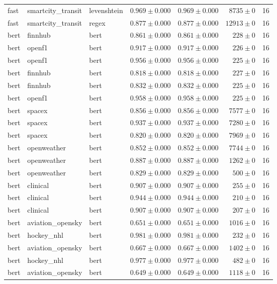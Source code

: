 \begin{table}[htbp]
\begin{tabular}{l l l r r r r}
fast & smartcity\_transit & levenshtein & $0.969\pm0.000$ & $0.969\pm0.000$ & $8735\pm0$ & 16 \\
fast & smartcity\_transit & regex & $0.877\pm0.000$ & $0.877\pm0.000$ & $12913\pm0$ & 16 \\
bert & finnhub & bert & $0.861\pm0.000$ & $0.861\pm0.000$ & $228\pm0$ & 16 \\
bert & openf1 & bert & $0.917\pm0.000$ & $0.917\pm0.000$ & $226\pm0$ & 16 \\
bert & openf1 & bert & $0.956\pm0.000$ & $0.956\pm0.000$ & $225\pm0$ & 16 \\
bert & finnhub & bert & $0.818\pm0.000$ & $0.818\pm0.000$ & $227\pm0$ & 16 \\
bert & finnhub & bert & $0.832\pm0.000$ & $0.832\pm0.000$ & $225\pm0$ & 16 \\
bert & openf1 & bert & $0.958\pm0.000$ & $0.958\pm0.000$ & $225\pm0$ & 16 \\
bert & spacex & bert & $0.856\pm0.000$ & $0.856\pm0.000$ & $7577\pm0$ & 16 \\
bert & spacex & bert & $0.937\pm0.000$ & $0.937\pm0.000$ & $7280\pm0$ & 16 \\
bert & spacex & bert & $0.820\pm0.000$ & $0.820\pm0.000$ & $7969\pm0$ & 16 \\
bert & openweather & bert & $0.852\pm0.000$ & $0.852\pm0.000$ & $7744\pm0$ & 16 \\
bert & openweather & bert & $0.887\pm0.000$ & $0.887\pm0.000$ & $1262\pm0$ & 16 \\
bert & openweather & bert & $0.829\pm0.000$ & $0.829\pm0.000$ & $500\pm0$ & 16 \\
bert & clinical & bert & $0.907\pm0.000$ & $0.907\pm0.000$ & $255\pm0$ & 16 \\
bert & clinical & bert & $0.944\pm0.000$ & $0.944\pm0.000$ & $210\pm0$ & 16 \\
bert & clinical & bert & $0.907\pm0.000$ & $0.907\pm0.000$ & $207\pm0$ & 16 \\
bert & aviation\_opensky & bert & $0.651\pm0.000$ & $0.651\pm0.000$ & $1016\pm0$ & 16 \\
bert & hockey\_nhl & bert & $0.981\pm0.000$ & $0.981\pm0.000$ & $232\pm0$ & 16 \\
bert & aviation\_opensky & bert & $0.667\pm0.000$ & $0.667\pm0.000$ & $1402\pm0$ & 16 \\
bert & hockey\_nhl & bert & $0.977\pm0.000$ & $0.977\pm0.000$ & $482\pm0$ & 16 \\
bert & aviation\_opensky & bert & $0.649\pm0.000$ & $0.649\pm0.000$ & $1118\pm0$ & 16 \\

\end{tabular}
\end{table}
